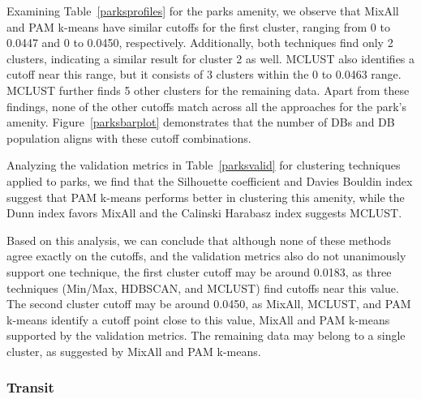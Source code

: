 \documentclass[11pt, a4paper]{article}
\begin{document}
Examining Table~\ref{parksprofiles} for the parks amenity, we observe that MixAll and PAM k-means have similar cutoffs for the first cluster, ranging from 0 to 0.0447 and 0 to 0.0450, respectively. Additionally, both techniques find only 2 clusters, indicating a similar result for cluster 2 as well. MCLUST also identifies a cutoff near this range, but it consists of 3 clusters within the 0 to 0.0463 range. MCLUST further finds 5 other clusters for the remaining data. Apart from these findings, none of the other cutoffs match across all the approaches for the park's amenity. Figure~\ref{parksbarplot} demonstrates that the number of DBs and DB population aligns with these cutoff combinations.
\par
Analyzing the validation metrics in Table~\ref{parksvalid} for clustering techniques applied to parks, we find that the Silhouette coefficient and Davies Bouldin index suggest that PAM k-means performs better in clustering this amenity, while the Dunn index favors MixAll and the Calinski Harabasz index suggests MCLUST.
\par
Based on this analysis, we can conclude that although none of these methods agree exactly on the cutoffs, and the validation metrics also do not unanimously support one technique, the first cluster cutoff may be around 0.0183, as three techniques (Min/Max, HDBSCAN, and MCLUST) find cutoffs near this value. The second cluster cutoff may be around 0.0450, as MixAll, MCLUST, and PAM k-means identify a cutoff point close to this value, MixAll and PAM k-means supported by the validation metrics. The remaining data may belong to a single cluster, as suggested by MixAll and PAM k-means.




\subsubsection{Transit}
\end{document}
